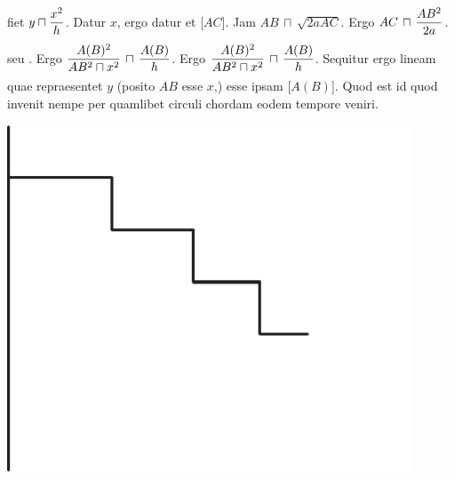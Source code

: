 fiet $\displaystyle y \sqcap \rule[-4mm]{0mm}{10mm} \frac{x^2}{h}$.
Datur $\displaystyle x$, ergo datur et
 [$\displaystyle AC$].
Jam $\displaystyle AB \, \sqcap \, \sqrt{2aAC}$.
Ergo 
$\displaystyle AC \, \sqcap \, \rule[-4mm]{0mm}{10mm} \frac{AB^2}{2a}$.
seu .
Ergo $\displaystyle \rule[-4mm]{0mm}{10mm} \frac{A(B)^2}{AB^2 \sqcap x^2} \,  \sqcap \,  \frac{A(B)}{h}$.
Ergo $\displaystyle \rule[-4mm]{0mm}{10mm} \frac{A(B)^2}{AB^2 \sqcap x^2} \,  \sqcap \, \frac{A(B)}{h}$.
   Sequitur ergo lineam quae repraesentet $\displaystyle y$
(posito $\displaystyle AB$ esse $\displaystyle x$,)
esse ipsam [$\displaystyle A(B)$].
Quod est id quod invenit
nempe per quamlibet circuli chordam eodem tempore
 veniri.
\pend
\vspace{3em}
\pstart
\noindent
\begin{minipage}[c]{0.5\textwidth}
\includegraphics[trim = -30mm -7mm -5mm 0mm, clip, width=0.9\textwidth]{images/lh03705_006v-d2.pdf}
\end{minipage}

